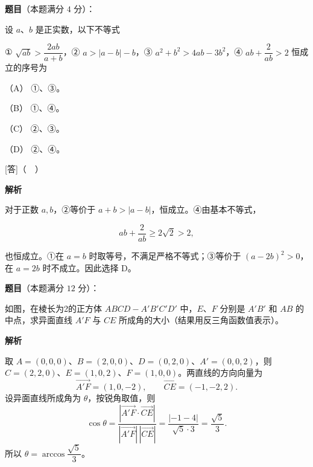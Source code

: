 \begin{answer}

\textbf{题目}（本题满分 $4$ 分）：

设 $a$、$b$ 是正实数，以下不等式

① $\sqrt{ab}>\dfrac{2ab}{a+b}$，② $a>|a-b|-b$，③ $a^2+b^2>4ab-3b^2$，④ $ab+\dfrac2{ab}>2$ 恒成立的序号为

（A） ①、③。

（B） ①、④。

（C） ②、③。

（D） ②、④。

[答]（　）

\textbf{解析}

对于正数 $a,b$，②等价于 $a+b>|a-b|$，恒成立。④由基本不等式，

\nopagebreak[4]
\[
ab+\frac2{ab}\ge2\sqrt2>2,
\]

也恒成立。①在 $a=b$ 时取等号，不满足严格不等式；③等价于 $(a-2b)^2>0$，在 $a=2b$ 时不成立。因此选择 D。


\end{answer}
\begin{answer}

\textbf{题目}（本题满分 $12$ 分）：

如图，在棱长为2的正方体 $ABCD-A'B'C'D'$ 中，$E$、$F$ 分别是 $A'B'$ 和 $AB$ 的中点，求异面直线 $A'F$ 与 $CE$ 所成角的大小（结果用反三角函数值表示）。
\nopagebreak[4]
\begin{center}\end{center}
\nopagebreak[4]
\textbf{解析}

取 $A=(0,0,0)$、$B=(2,0,0)$、$D=(0,2,0)$、$A'=(0,0,2)$，则 $C=(2,2,0)$、$E=(1,0,2)$、$F=(1,0,0)$。两直线的方向向量为
\nopagebreak[4]
\[
\overrightarrow{A'F}=(1,0,-2),\qquad \overrightarrow{CE}=(-1,-2,2).
\]
设异面直线所成角为 $\theta$，按锐角取值，则
\nopagebreak[4]
\[
\cos\theta=\frac{|\overrightarrow{A'F}\cdot\overrightarrow{CE}|}{|\overrightarrow{A'F}|\,|\overrightarrow{CE}|}
=\frac{|-1-4|}{\sqrt5\cdot3}=\frac{\sqrt5}{3}.
\]
所以 $\theta=\arccos\dfrac{\sqrt5}{3}$。


\end{answer}
